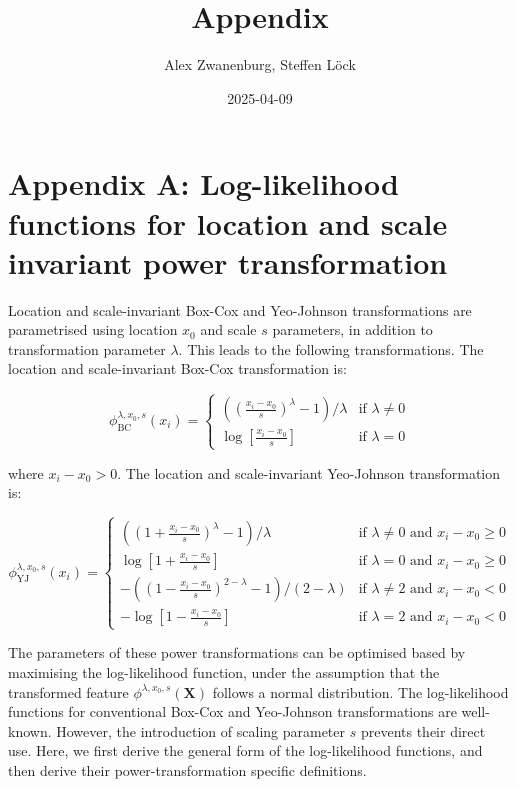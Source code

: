 \documentclass[
  a4paper,
]{article}
\title{Appendix}
\author{Alex Zwanenburg, Steffen Löck}
\date{2025-04-09}
\begin{document}
\maketitle

\section{Appendix A: Log-likelihood functions for location and scale
invariant power
transformation}\label{appendix-a-log-likelihood-functions-for-location-and-scale-invariant-power-transformation}

Location and scale-invariant Box-Cox and Yeo-Johnson transformations are
parametrised using location \(x_0\) and scale \(s\) parameters, in
addition to transformation parameter \(\lambda\). This leads to the
following transformations. The location and scale-invariant Box-Cox
transformation is:

\begin{equation}
\phi_{\text{BC}}^{\lambda, x_0, s} (x_i) = 
\begin{cases}
\left( \left(\frac{x_i - x_0}{s} \right)^\lambda - 1 \right) / \lambda & \text{if } \lambda \neq 0\\
\log\left[\frac{x_i - x_0}{s}\right] & \text{if } \lambda = 0
\end{cases}
\end{equation}

where \(x_i - x_0 > 0\). The location and scale-invariant Yeo-Johnson
transformation is:

\begin{equation}
\phi_{\text{YJ}}^{\lambda, x_0, s} (x_i) = 
\begin{cases}
\left( \left( 1 + \frac{x_i - x_0}{s}\right)^\lambda - 1\right) / \lambda & \text{if } \lambda \neq 0 \text{ and } x_i - x_0 \geq 0\\
\log\left[1 + \frac{x_i - x_0}{s}\right] & \text{if } \lambda = 0 \text{ and } x_i - x_0 \geq 0\\
-\left( \left( 1 - \frac{x_i - x_0}{s}\right)^{2 - \lambda} - 1 \right) / \left(2 - \lambda \right) & \text{if } \lambda \neq 2 \text{ and } x_i - x_0 < 0\\
-\log\left[1 - \frac{x_i - x_0}{s}\right] & \text{if } \lambda = 2 \text{ and } x_i - x_0 < 0
\end{cases}
\end{equation}

The parameters of these power transformations can be optimised based by
maximising the log-likelihood function, under the assumption that the
transformed feature \(\phi^{\lambda, x_0, s} (\mathbf{X})\) follows a
normal distribution. The log-likelihood functions for conventional
Box-Cox and Yeo-Johnson transformations are well-known. However, the
introduction of scaling parameter \(s\) prevents their direct use. Here,
we first derive the general form of the log-likelihood functions, and
then derive their power-transformation specific definitions.
\end{document}

